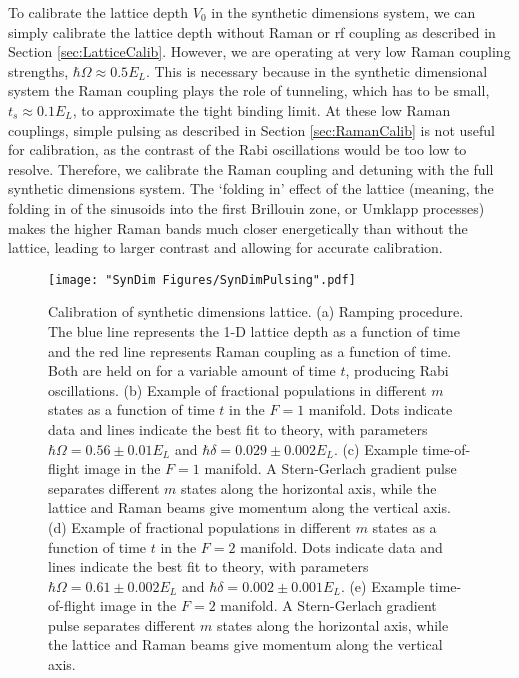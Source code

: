 To calibrate the lattice depth $V_0$ in the synthetic dimensions system, we can simply calibrate the lattice depth without Raman or rf coupling as described in Section \ref{sec:LatticeCalib}. However, we are operating at very low Raman coupling strengths, $\hbar\Omega\approx0.5 E_L$. This is necessary because in the synthetic dimensional system the Raman coupling plays the role of tunneling, which has to be small, $t_s\approx0.1 E_L$, to approximate the tight binding limit. At these low Raman couplings, simple pulsing as described in Section \ref{sec:RamanCalib} is not useful for calibration, as the contrast of the Rabi oscillations would be too low to resolve. Therefore, we calibrate the Raman coupling and detuning with the full synthetic dimensions system. The \lq{folding in}\rq{} effect of the lattice (meaning, the folding in of the sinusoids into the first Brillouin zone, or Umklapp processes) makes the higher Raman bands much closer energetically than without the lattice, leading to larger contrast and allowing for accurate calibration.  

\begin{figure}
	\texttt{[image: "SynDim Figures/SynDimPulsing".pdf]}
\caption[Calibration of synthetic dimensions lattice]{Calibration of synthetic dimensions lattice. (a) Ramping procedure. The blue line represents the 1-D lattice depth as a function of time and the red line represents Raman coupling as a function of time. Both are held on for a variable amount of time $t$, producing Rabi oscillations. (b) Example of fractional populations in different $m$ states as a function of time $t$ in the $F=1$ manifold. Dots indicate data and lines indicate the best fit to theory, with parameters $\hbar\Omega=0.56\pm0.01 E_L$ and $\hbar\delta = 0.029 \pm 0.002 E_L$. (c) Example time-of-flight image in the $F=1$ manifold. A Stern-Gerlach gradient pulse separates different $m$ states along the horizontal axis, while the lattice and Raman beams give momentum along the vertical axis. (d)  Example of fractional populations in different $m$ states as a function of time $t$ in the $F=2$ manifold. Dots indicate data and lines indicate the best fit to theory, with parameters $\hbar\Omega=0.61\pm0.002 E_L$ and $\hbar\delta = 0.002 \pm 0.001 E_L$. (e) Example time-of-flight image in the $F=2$ manifold. A Stern-Gerlach gradient pulse separates different $m$ states along the horizontal axis, while the lattice and Raman beams give momentum along the vertical axis.  }
\label{fig:SynDimPulsing}
\end{figure}

